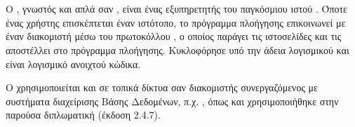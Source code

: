 \section{}

Ο {} \cite{Ap01}, γνωστός και απλά σαν {}, είναι ένας εξυπηρετητής του παγκόσμιου ιστού {}. 
Όποτε ένας χρήστης επισκέπτεται έναν ιστότοπο, το πρόγραμμα πλοήγησης {} επικοινωνεί με έναν διακομιστή {} 
μέσω του πρωτοκόλλου {}, ο οποίος παράγει τις ιστοσελίδες και τις αποστέλλει στο πρόγραμμα πλοήγησης. 
Κυκλοφόρησε υπό την άδεια λογισμικού {} και είναι λογισμικό ανοιχτού κώδικα.

\par Ο {} χρησιμοποιείται και σε τοπικά δίκτυα σαν διακομιστής συνεργαζόμενος με συστήματα διαχείρισης Βάσης Δεδομένων, π.χ. {},
όπως και χρησιμοποιήθηκε στην παρούσα διπλωματική (έκδοση 2.4.7).

\section{}


